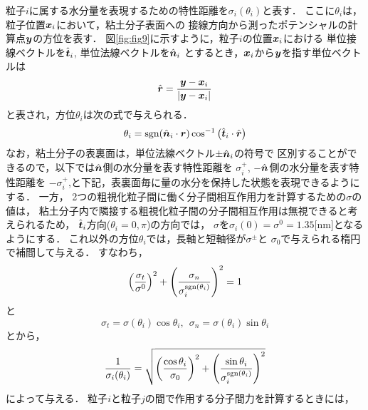 粒子$i$に属する水分量を表現するための特性距離を$\sigma_i(\theta_i)$と表す．
ここに$\theta_i$は，粒子位置$\mbox{\boldmath $x$}_i$において，粘土分子表面への
接線方向から測ったポテンシャルの計算点$\mbox{\boldmath $y$}$の方位を表す．
図\ref{fig:fig9}に示すように，粒子$i$の位置$\mbox{\boldmath $x$}_i$における
単位接線ベクトルを$\hat{\mbox{\boldmath $t$}}_i$, 単位法線ベクトルを$\hat{\mbox{\boldmath $n$}}_i$
とするとき，$\mbox{\boldmath $x$}_i$から$\mbox{\boldmath $y$}$を指す単位ベクトルは
\begin{equation}
	\hat{\mbox{\boldmath $r$}}=\frac{\mbox{\boldmath $y$}-\mbox{\boldmath $x$}_i}{\left| \mbox{\boldmath $y$}-\mbox{\boldmath $x$}_i\right|}
	\label{eqn:def_rhat}
\end{equation}
と表され，方位$\theta_i$は次の式で与えられる．
\begin{equation}
	\theta_i = {\rm sgn} (\hat{\mbox{\boldmath $n$}}_i \cdot \mbox{\boldmath $r$}) 
	\cos^{-1}\left( \hat{\mbox{\boldmath $t$}}_i\cdot \hat{\mbox{\boldmath $r$}}\right)
	\label{eqn:def_th}
\end{equation}
なお，粘土分子の表裏面は，単位法線ベクトル$\pm \hat{\mbox{\boldmath $n$}}_i$の符号で
区別することができるので，以下では$\hat{\mbox{\boldmath $n$}}$側の水分量を表す特性距離を
$\sigma^+_i$, $-\hat{\mbox{\boldmath $n$}}$側の水分量を表す特性距離を
$-\sigma^+_i$,と下記，表裏面毎に量の水分を保持した状態を表現できるようにする．
一方， 2つの粗視化粒子間に働く分子間相互作用力を計算するための${\sigma}$の値は，
粘土分子内で隣接する粗視化粒子間の分子間相互作用は無視できると考えられるため，
$\hat{\mbox{\boldmath $t$}}_i$方向($\theta_i=0,\pi$)の方向では，
$\sigma$を$\sigma_i(0)=\sigma^0=1.35$[nm]となるようにする．
これ以外の方位$\theta_i$では，長軸と短軸径が$\sigma^\pm$と
$\sigma_0$で与えられる楕円で補間して与える．
すなわち，
\begin{equation}
	\left( \frac{\sigma_t}{\sigma^0} \right)^2
	+
	\left( \frac{\sigma_n}{\sigma^{{\rm sgn}(\theta_i)}_i} \right)^2
	=
	1
	\label{eqn:sigma_ellip}
\end{equation}
と
\begin{equation}
	\sigma_t=\sigma(\theta_i)\cos\theta_i, \ \ 
	\sigma_n=\sigma(\theta_i)\sin\theta_i
	\label{eqn:local_basis}
\end{equation}
とから，
\begin{equation}
	\frac{1}{\sigma_i(\theta_i)}
	=
	\sqrt{
		\left( 
		\frac{\cos\theta_i}{\sigma_0} 
		\right)^2
		+
		\left( 
			\frac{\sin\theta_i}{\sigma_i^{{\rm sgn}(\theta_i)}}
		\right)^2
	}
	\label{eqn:sigma_th}
\end{equation}
によって与える．
粒子$i$と粒子$j$の間で作用する分子間力を計算するときには，
